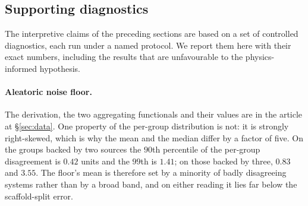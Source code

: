 \subsection{Supporting diagnostics} \label{sec:supporting}

The interpretive claims of the preceding sections are based on a set of controlled diagnostics, each run under a named protocol. We report them here with their exact numbers, including the results that are unfavourable to the physics-informed hypothesis.

\paragraph{Aleatoric noise floor.} The derivation, the two aggregating functionals and their values
are in the article at \S\ref{sec:data}. One property of the per-group distribution is not: it is
strongly right-skewed, which is why the mean and the median differ by a factor of five. On the
groups backed by two sources the $90$th percentile of the per-group disagreement is $0.42$ \lnx{}
units and the $99$th is $1.41$; on those backed by three, $0.83$ and $3.55$. The floor's
mean is therefore set by a minority of badly disagreeing systems rather than by a broad band, and on
either reading it lies far below the scaffold-split error.

